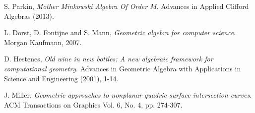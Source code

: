 \documentclass{birkjour}
\theoremstyle{definition}
\theoremstyle{remark}
\numberwithin{equation}{section}
\begin{document}
\begin{thebibliography}{9}

S. Parkin, {\it Mother Minkowski Algebra Of Order $M$}.
Advances in Applied Clifford Algebras (2013).

L. Dorst, D. Fontijne and S. Mann, {\it Geometric algebra for computer
science}. Morgan Kaufmann, 2007.

D. Hestenes, {\it Old wine in new bottles: A new algebraic
framework for computational geometry}. Advances in Geometric
Algebra with Applications in Science and Engineering (2001), 1-14.

J. Miller, {\it Geometric approaches to nonplanar quadric surface
intersection curves}. ACM Transactions on Graphics Vol. 6, No. 4, pp.
274-307.

\end{thebibliography}
\end{document}
